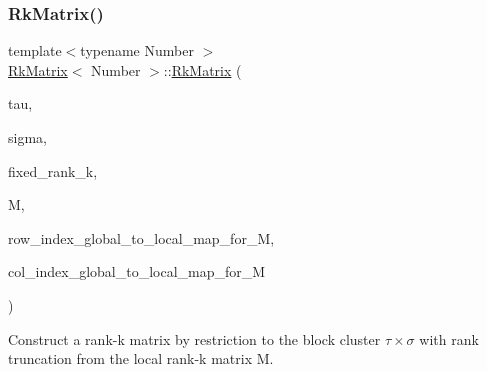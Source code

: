 \mbox{\label{classRkMatrix_a5a2841fc6a697007fafcab2619fc5390}} 
\subsubsection{\texorpdfstring{Rk\+Matrix()}{RkMatrix()}\hspace{0.1cm}{\footnotesize\ttfamily [11/18]}}
{\footnotesize\ttfamily template$<$typename Number $>$ \\
\hyperlink{classRkMatrix}{Rk\+Matrix}$<$ Number $>$\+::\hyperlink{classRkMatrix}{Rk\+Matrix} (\begin{DoxyParamCaption}\item[{const std\+::vector$<$ types\+::global\+\_\+dof\+\_\+index $>$ \&}]{tau,  }\item[{const std\+::vector$<$ types\+::global\+\_\+dof\+\_\+index $>$ \&}]{sigma,  }\item[{const \hyperlink{classRkMatrix_add060bfc3a4cc77f858c3d6dd58cadd5}{size\+\_\+type}}]{fixed\+\_\+rank\+\_\+k,  }\item[{const \hyperlink{classRkMatrix}{Rk\+Matrix}$<$ Number $>$ \&}]{M,  }\item[{const std\+::map$<$ types\+::global\+\_\+dof\+\_\+index, size\+\_\+t $>$ \&}]{row\+\_\+index\+\_\+global\+\_\+to\+\_\+local\+\_\+map\+\_\+for\+\_\+M,  }\item[{const std\+::map$<$ types\+::global\+\_\+dof\+\_\+index, size\+\_\+t $>$ \&}]{col\+\_\+index\+\_\+global\+\_\+to\+\_\+local\+\_\+map\+\_\+for\+\_\+M }\end{DoxyParamCaption})}

Construct a rank-\/k matrix by restriction to the block cluster $\tau \times \sigma$ with rank truncation from the local rank-\/k matrix {\ttfamily M}.


